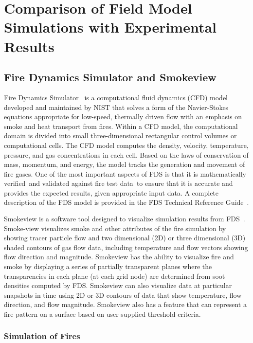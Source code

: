 \documentclass[twoside]{uocthesis}
\begin{document}
\chapter{Comparison of Field Model Simulations with Experimental Results}

\section{Fire Dynamics Simulator and Smokeview}

Fire Dynamics Simulator~\cite{FDS_Users_Guide} is a computational fluid dynamics (CFD) model developed and maintained by NIST that solves a form of the Navier-Stokes equations appropriate for low-speed, thermally driven flow with an emphasis on smoke and heat transport from fires. Within a CFD model, the computational domain is divided into small three-dimensional rectangular control volumes or computational cells. The CFD model computes the density, velocity, temperature, pressure, and gas concentrations in each cell. Based on the laws of conservation of mass, momentum, and energy, the model tracks the generation and movement of fire gases. One of the most important aspects of FDS is that it is mathematically verified~\cite{FDS_Verification_Guide}and validated against fire test data~\cite{FDS_Validation_Guide}to ensure that it is accurate and provides the expected results, given appropriate input data. A complete description of the FDS model is provided in the FDS Technical Reference Guide~\cite{FDS_Tech_Guide}.

Smokeview is a software tool designed to visualize simulation results from FDS~\cite{Smokeview_Users_Guide}. Smoke-view visualizes smoke and other attributes of the fire simulation by showing tracer particle flow and two dimensional (2D) or three dimensional (3D) shaded contours of gas flow data, including temperature and flow vectors showing flow direction and magnitude. Smokeview has the ability to visualize fire and smoke by displaying a series of partially transparent planes where the transparencies in each plane (at each grid node) are determined from soot densities computed by FDS. Smokeview can also visualize data at particular snapshots in time using 2D or 3D contours of data that show temperature, flow direction, and flow magnitude.  Smokeview also has a feature that can represent a fire pattern on a surface based on user supplied threshold criteria.


\subsection{Simulation of Fires}
\end{document}
